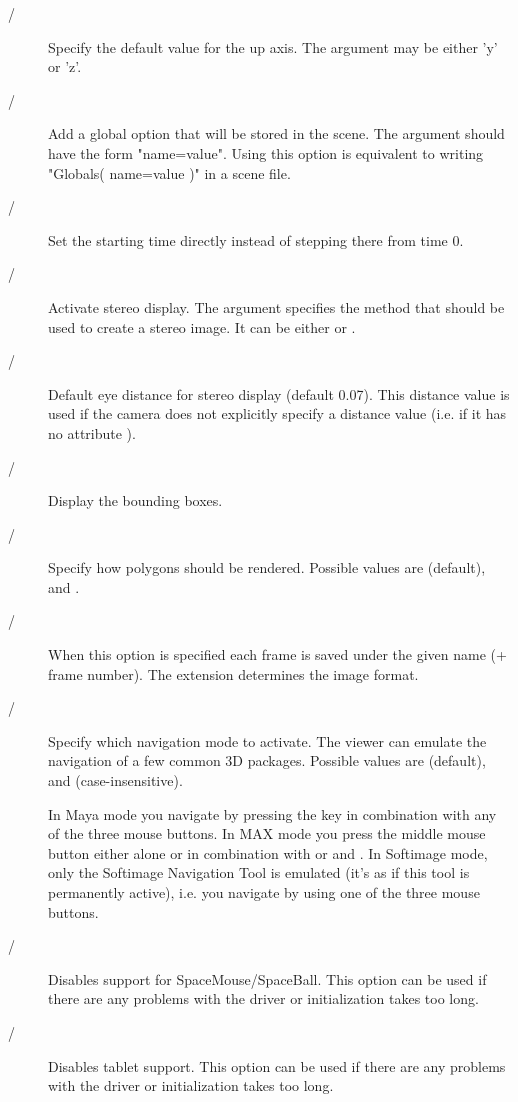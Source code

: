 \begin{description}
\item[ / ]
Specify the default value for the up axis. The argument may be either
'y' or 'z'.

\item[ / ]
Add a global option that will be stored in the scene. The argument should
have the form "name=value". Using this option is equivalent to writing
"Globals( name=value )" in a scene file.

\item[ / ]
Set the starting time directly instead of stepping there from time 0.

\item[ / ]
Activate stereo display. The argument specifies the method that should be
used to create a stereo image. It can be either  or .

\item[ / ]
Default eye distance for stereo display (default 0.07). This distance
value is used if the camera does not explicitly specify a distance value
(i.e. if it has no attribute ).

\item[ / ]
Display the bounding boxes.

\item[ / ]
Specify how polygons should be rendered. Possible values are
 (default),  and .

\item[ / ]
When this option is specified each frame is saved under the given name
(+ frame number). The extension determines the image format.

\item[ / ]
Specify which navigation mode to activate. The viewer can emulate the
navigation of a few common 3D packages. Possible values are
 (default),  and  (case-insensitive).

In Maya mode you navigate by pressing the  key in combination
with any of the three mouse buttons. In MAX mode you press the middle
mouse button either alone or in combination with  or 
and . In Softimage mode, only the Softimage Navigation Tool is
emulated (it's as if this tool is permanently active), i.e. you navigate
by using one of the three mouse buttons.

\item[ / ]
Disables support for SpaceMouse/SpaceBall. This option can be used if there
are any problems with the driver or initialization takes too long.

\item[ / ]
Disables tablet support. This option can be used if there are any
problems with the driver or initialization takes too long.

\end{description}

